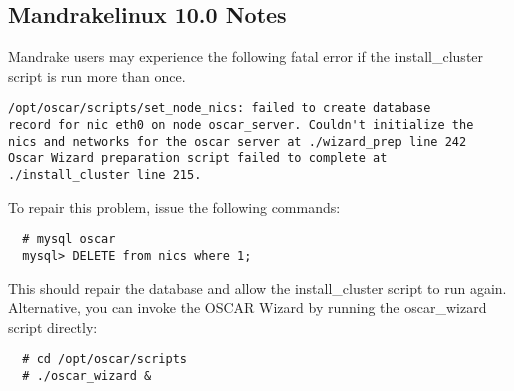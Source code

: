 \subsection{Mandrakelinux 10.0 Notes}
\label{subsec:mdk10notes}

Mandrake users may experience the following fatal error if the
install\_cluster script is run more than once.

\begin{verbatim}
/opt/oscar/scripts/set_node_nics: failed to create database
record for nic eth0 on node oscar_server. Couldn't initialize the
nics and networks for the oscar server at ./wizard_prep line 242
Oscar Wizard preparation script failed to complete at
./install_cluster line 215.
\end{verbatim}

To repair this problem, issue the following commands:
\begin{verbatim}
  # mysql oscar
  mysql> DELETE from nics where 1;
\end{verbatim}
This should repair the database and allow the install\_cluster script
to run again.  Alternative, you can invoke the OSCAR Wizard by running
the oscar\_wizard script directly:
\begin{verbatim}
  # cd /opt/oscar/scripts
  # ./oscar_wizard &
\end{verbatim}
\endchange

